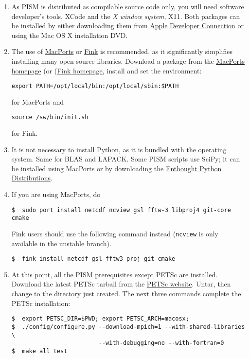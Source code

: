 \documentclass[titlepage,letterpaper,final]{scrartcl}
\begin{document}
\begin{enumerate}
\item As PISM is distributed as compilable source code only, you will need
  software developer's tools, XCode and the \emph{X window system}, X11. Both
  packages can be installed by either downloading them from
  \href{http://developer.apple.com/tools/xcode/}{Apple Developer Connection} or
  using the Mac OS X installation DVD.
\item The use of \href{http://www.macports.org/}{MacPorts} or
  \href{http://www.finkproject.org/}{Fink} is recommended, as it significantly
  simplifies installing many open-source libraries. Download a package from the
  \href{http://www.macports.org/install.php}{MacPorts homepage} (or
  (\href{http://www.finkproject.org/download/index.php}{Fink homepage}, install
  and set the environment:

\begin{verbatim}
export PATH=/opt/local/bin:/opt/local/sbin:$PATH
\end{verbatim}
for MacPorts and
\begin{verbatim}
source /sw/bin/init.sh
\end{verbatim}
for Fink.

\item It is not necessary to install Python, as it is bundled with
  the operating system.  Same for BLAS and LAPACK.
  Some PISM scripts use SciPy; it can be installed using MacPorts or 
  by downloading the \href{http://www.enthought.com/}{Enthought Python Distributions}.

\item  If you are using MacPorts, do
\begin{verbatim}
$  sudo port install netcdf ncview gsl fftw-3 libproj4 git-core cmake
\end{verbatim}%

Fink users should use the following command instead (\texttt{ncview} is only available in the unstable branch).
\begin{verbatim}
$  fink install netcdf gsl fftw3 proj git cmake
\end{verbatim}

\item At this point, all the PISM prerequisites except PETSc are installed.
Download the latest PETSc tarball from the
  \href{http://www.mcs.anl.gov/petsc/petsc-as/}{PETSc website}.
Untar, then change to the directory just created.
The next three commands complete the PETSc installation:
\begin{verbatim}
$  export PETSC_DIR=$PWD; export PETSC_ARCH=macosx;
$  ./config/configure.py --download-mpich=1 --with-shared-libraries \
                         --with-debugging=no --with-fortran=0
$  make all test
\end{verbatim}


\end{enumerate}
\end{document}
